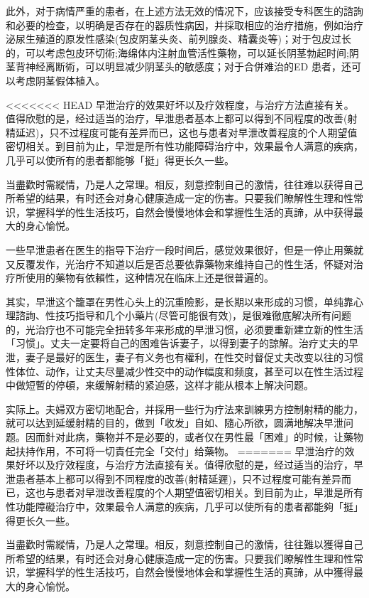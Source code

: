 \documentclass[12pt,UTF8]{ctexbook}
\begin{document}
此外，对于病情严重的患者，在上述方法无效的情况下，应该接受专科医生的諮詢和必要的检查，以明确是否存在的器质性病因，并採取相应的治疗措施，例如治疗泌尿生殖道的原发性感染(包皮阴茎头炎、前列腺炎、精囊炎等)；对于包皮过长的，可以考虑包皮环切術;海绵体内注射血管活性藥物，可以延长阴茎勃起时间;阴茎背神经离断術，可以明显减少阴茎头的敏感度；对于合併难治的ED 患者，还可以考虑阴茎假体植入。

<<<<<<< HEAD
早泄治疗的效果好坏以及疗效程度，与治疗方法直接有关。值得欣慰的是，经过适当的治疗，早泄患者基本上都可以得到不同程度的改善(射精延迟)，只不过程度可能有差异而已，这也与患者对早泄改善程度的个人期望值密切相关。到目前为止，早泄是所有性功能障碍治疗中，效果最令人满意的疾病，几乎可以使所有的患者都能够「挺」得更长久一些。

当盡歡时需縱情，乃是人之常理。相反，刻意控制自己的激情，往往难以获得自己所希望的结果，有时还会对身心健康造成一定的伤害。只要我们瞭解性生理和性常识，掌握科学的性生活技巧，自然会慢慢地体会和掌握性生活的真諦，从中获得最大的身心愉悦。

一些早泄患者在医生的指导下治疗一段时间后，感觉效果很好，但是一停止用藥就又反覆发作，光治疗不知道以后是否总要依靠藥物来维持自己的性生活，怀疑对治疗所使用的藥物有依賴性，这种情况在临床上还是很普遍的。

其实，早泄这个籠罩在男性心头上的沉重險影，是长期以来形成的习惯，单纯靠心理諮詢、性技巧指导和几个小藥片(尽管可能很有效)，是很难徹底解决所有问题的，光治疗也不可能完全扭转多年来形成的早泄习惯，必须要重新建立新的性生活「习惯」。丈夫一定要将自己的困难告诉妻子，以得到妻子的諒解。治疗丈夫的早泄，妻子是最好的医生，妻子有义务也有權利，在性交时督促丈夫改变以往的习惯性体位、动作，让丈夫尽量减少性交中的动作幅度和频度，甚至可以在性生活过程中做短暫的停頓，来缓解射精的紧迫感，这样才能从根本上解决问题。

实际上。夫婦双方密切地配合，并採用一些行为疗法来訓練男方控制射精的能力，就可以达到延缓射精的目的，做到「收发」自如、隨心所欲，圆满地解决早泄问题。因而針对此病，藥物并不是必要的，或者仅在男性最「困难」的时候，让藥物起扶持作用，不可将一切責任完全「交付」给藥物。
=======
早泄治疗的效果好坏以及疗效程度，与治疗方法直接有关。值得欣慰的是，经过适当的治疗，早泄患者基本上都可以得到不同程度的改善(射精延遲)，只不过程度可能有差异而已，这也与患者对早泄改善程度的个人期望值密切相关。到目前为止，早泄是所有性功能障礙治疗中，效果最令人满意的疾病，几乎可以使所有的患者都能夠「挺」得更长久一些。

当盡歡时需縱情，乃是人之常理。相反，刻意控制自己的激情，往往難以獲得自己所希望的结果，有时还会对身心健康造成一定的伤害。只要我们瞭解性生理和性常识，掌握科学的性生活技巧，自然会慢慢地体会和掌握性生活的真諦，从中獲得最大的身心愉悦。
\end{document}
